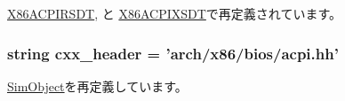 \hyperlink{classACPI_1_1X86ACPIRSDT_a58cd55cd4023648e138237cfc0822ae3}{X86ACPIRSDT}, と \hyperlink{classACPI_1_1X86ACPIXSDT_a58cd55cd4023648e138237cfc0822ae3}{X86ACPIXSDT}で再定義されています。\hypertarget{classACPI_1_1X86ACPISysDescTable_a17da7064bc5c518791f0c891eff05fda}{
\subsubsection[{cxx\_\-header}]{\setlength{\rightskip}{0pt plus 5cm}string {\bf cxx\_\-header} = 'arch/x86/bios/acpi.hh'}}
\label{classACPI_1_1X86ACPISysDescTable_a17da7064bc5c518791f0c891eff05fda}


\hyperlink{classm5_1_1SimObject_1_1SimObject_a17da7064bc5c518791f0c891eff05fda}{SimObject}を再定義しています。

